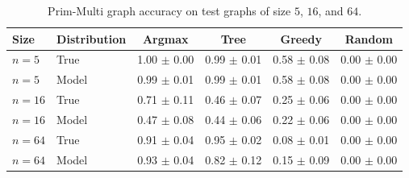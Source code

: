 \begin{table}[hbt!]
    \centering
    \small
    \begin{tabular}{llcccc}
        \toprule
        \textbf{Size} & \textbf{Distribution} & \textbf{Argmax} & \textbf{Tree} & \textbf{Greedy} & \textbf{Random} \\
        \midrule
        $n=5$ & True & 1.00 $\pm$ 0.00 & 0.99 $\pm$ 0.01 & 0.58 $\pm$ 0.08 & 0.00 $\pm$ 0.00 \\
        $n=5$ & Model & 0.99 $\pm$ 0.01 & 0.99 $\pm$ 0.01 & 0.58 $\pm$ 0.08 & 0.00 $\pm$ 0.00 \\
        $n=16$ & True & 0.71 $\pm$ 0.11 & 0.46 $\pm$ 0.07 & 0.25 $\pm$ 0.06 & 0.00 $\pm$ 0.00 \\
        $n=16$ & Model & 0.47 $\pm$ 0.08 & 0.44 $\pm$ 0.06 & 0.22 $\pm$ 0.06 & 0.00 $\pm$ 0.00 \\
        $n=64$ & True & 0.91 $\pm$ 0.04 & 0.95 $\pm$ 0.02 & 0.08 $\pm$ 0.01 & 0.00 $\pm$ 0.00 \\
        $n=64$ & Model & 0.93 $\pm$ 0.04 & 0.82 $\pm$ 0.12 & 0.15 $\pm$ 0.09 & 0.00 $\pm$ 0.00 \\
        \bottomrule
    \end{tabular}
    \caption{Prim-Multi graph accuracy on test graphs of size $5$, $16$, and $64$.}
    \label{tab:prim-graph-accuracy}
\end{table}
